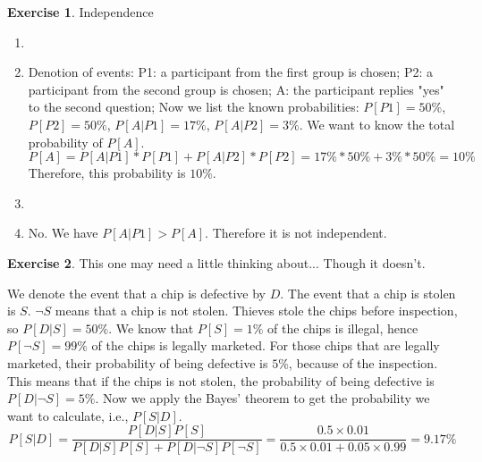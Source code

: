 \documentclass[12pt,a4paper]{article}
\makeatletter
\theoremstyle{definition}
\newtheorem{exercise}{Exercise}
\newtheorem*{solution}{Solution}
\renewenvironment{solution}[1][Solution] {\par\pushQED{\qed}\normalfont\topsep6\p@\@plus6\p@\relax\trivlist\item[\hskip\labelsep\bfseries#1\@addpunct{.}]\ignorespaces}{\popQED\endtrivlist\@endpefalse} \makeatother
\makeatother
\begin{document}
\begin{exercise}
    Independence
    \begin{enumerate}[label=\roman*)]
        \item
        \begin{solution}
            Denotion of events:
            \newline P1: a participant from the first group is chosen;
            \newline P2: a participant from the second group is chosen;
            \newline A: the participant replies "yes" to the second question;
            \newline Now we list the known probabilities: $P[P1]=50\%$, $P[P2]=50\%$, $P[A|P1]=17\%$, $P[A|P2]=3\%$. We want to know the total probability of $P[A]$.
            \begin{equation*}
                P[A]=P[A|P1]*P[P1]+P[A|P2]*P[P2]=17\% * 50\% + 3\% * 50\% = 10\%
            \end{equation*}
            Therefore, this probability is $10\%$.
        \end{solution}
        \item 
        \begin{solution}
            No. We have $P[A|P1] > P[A]$. Therefore it is not independent.
        \end{solution}
    \end{enumerate}
\end{exercise}
\begin{exercise}
    This one may need a little thinking about... Though it doesn't.
    \begin{solution}
        We denote the event that a chip is defective by $D$. The event that a chip is stolen is $S$. $\neg S$ means that a chip is not stolen. Thieves stole the chips before inspection, so $P[D|S]=50\% $. We know that $P[S]=1\%$ of the chips is illegal, hence $P[\neg S] = 99\%$ of the chips is legally marketed. For those chips that are legally marketed, their probability of being defective is $5\%$, because of the inspection. This means that if the chips is not stolen, the probability of being defective is $P[D|\neg S]=5\%$. Now we apply the Bayes' theorem to get the probability we want to calculate, i.e., $P[S|D]$.
        \begin{equation*}
            P[S|D]=\frac{P[D|S]P[S]}{P[D|S]P[S]+P[D|\neg S]P[\neg S]}=\frac{0.5\times 0.01}{0.5\times 0.01+0.05\times 0.99}=9.17\%
        \end{equation*}
    \end{solution}
\end{exercise}
\end{document}
